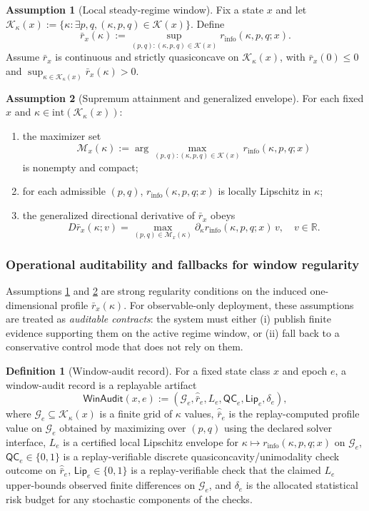 \documentclass[11pt,a4paper]{article}
\newcommand{\R}{\mathbb{R}}
\newcommand{\cK}{\mathcal{K}}
\newcommand{\cM}{\mathcal{M}}
\theoremstyle{definition}
\newtheorem{definition}{Definition}
\newtheorem{assumption}{Assumption}
\theoremstyle{remark}
\begin{document}
\begin{assumption}[Local steady-regime window]\label{ass:window}
Fix a state $x$ and let $\cK_\kappa(x):=\{\kappa:\exists p,q,(\kappa,p,q)\in\cK(x)\}$.
Define
\[
\bar r_x(\kappa):=\sup_{(p,q):(\kappa,p,q)\in\cK(x)} r_{\mathrm{info}}(\kappa,p,q;x).
\]
Assume $\bar r_x$ is continuous and strictly quasiconcave on $\cK_\kappa(x)$, with $\bar r_x(0)\le 0$ and $\sup_{\kappa\in\cK_\kappa(x)}\bar r_x(\kappa)>0$.
\end{assumption}

\begin{assumption}[Supremum attainment and generalized envelope]\label{ass:danskin}
For each fixed $x$ and $\kappa\in\mathrm{int}(\cK_\kappa(x))$:
\begin{enumerate}
  \item the maximizer set
  \[
  \cM_x(\kappa):=\arg\max_{(p,q):(\kappa,p,q)\in\cK(x)} r_{\mathrm{info}}(\kappa,p,q;x)
  \]
  is nonempty and compact;
  \item for each admissible $(p,q)$, $r_{\mathrm{info}}(\kappa,p,q;x)$ is locally Lipschitz in $\kappa$;
  \item the generalized directional derivative of $\bar r_x$ obeys
  \[
  D\bar r_x(\kappa;v)=\max_{(p,q)\in \cM_x(\kappa)} \partial_{\kappa}r_{\mathrm{info}}(\kappa,p,q;x)\,v,\quad v\in\R.
  \]
\end{enumerate}
\end{assumption}

\subsubsection{Operational auditability and fallbacks for window regularity}
Assumptions \ref{ass:window} and \ref{ass:danskin} are strong regularity conditions on the induced one-dimensional profile $\bar r_x(\kappa)$.
For observable-only deployment, these assumptions are treated as \emph{auditable contracts}: the system must either (i) publish finite evidence supporting them on the active regime window, or (ii) fall back to a conservative control mode that does not rely on them.

\begin{definition}[Window-audit record]\label{def:window_audit_record}
For a fixed state class $x$ and epoch $e$, a window-audit record is a replayable artifact
\[
\mathsf{WinAudit}(x,e):=(\mathcal G_e,\widehat{\bar r}_e, L_e, \mathsf{QC}_e, \mathsf{Lip}_e, \delta_e),
\]
where $\mathcal G_e\subseteq \cK_\kappa(x)$ is a finite grid of $\kappa$ values,
$\widehat{\bar r}_e$ is the replay-computed profile value on $\mathcal G_e$ obtained by maximizing over $(p,q)$ using the declared solver interface,
$L_e$ is a certified local Lipschitz envelope for $\kappa\mapsto r_{\mathrm{info}}(\kappa,p,q;x)$ on $\mathcal G_e$,
$\mathsf{QC}_e\in\{0,1\}$ is a replay-verifiable discrete quasiconcavity/unimodality check outcome on $\widehat{\bar r}_e$,
$\mathsf{Lip}_e\in\{0,1\}$ is a replay-verifiable check that the claimed $L_e$ upper-bounds observed finite differences on $\mathcal G_e$,
and $\delta_e$ is the allocated statistical risk budget for any stochastic components of the checks.
\end{definition}
\end{document}
